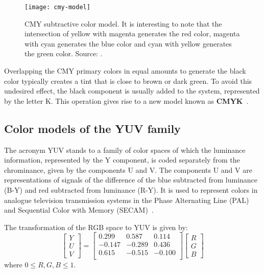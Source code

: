 \begin{figure}[!h]
  \centering
  \texttt{[image: cmy-model]}
  \caption[CMY subtractive color model]{CMY subtractive color model. It is interesting to note that the intersection of yellow with magenta generates the red color, magenta with cyan generates the blue color and cyan with yellow generates the green color. Source: \citet{rus:08}.}
  \label{fig:cmy-model}
\end{figure}

Overlapping the CMY primary colors in equal amounts to generate the black color typically creates a tint that is close to brown or dark green. To avoid this undesired effect, the black component is usually added to the system, represented by the letter K. This operation gives rise to a new model known as \textbf{CMYK}~\citep{gonzalez:02}.

\subsection{Color models of the YUV family}
\label{sec:modelo_cores_yuv}

The acronym YUV stands to a family of color spaces of which the luminance information, represented by the Y component, is coded separately from the chrominance, given by the components U and V. The components U and V are representations of signals of the difference of the blue subtracted from luminance (B-Y) and red subtracted from luminance (R-Y). It is used to represent colors in analogue television transmission systems in the Phase Alternating Line (PAL) and Sequential Color with Memory (SECAM)~\citep{pedrini:08}.

The transformation of the RGB space to YUV is given by:\\
\begin{equation}
  \begin{bmatrix}
    Y \\ U \\ V
  \end{bmatrix} = 
  \begin{bmatrix}
     0.299 &  0.587 &  0.114 \\
    -0.147 & -0.289 &  0.436 \\
     0.615 & -0.515 & -0.100 \\
  \end{bmatrix}
  \begin{bmatrix}
    R \\ G \\ B
  \end{bmatrix}
\end{equation}
where $0 \leq R, G, B \leq 1$.

